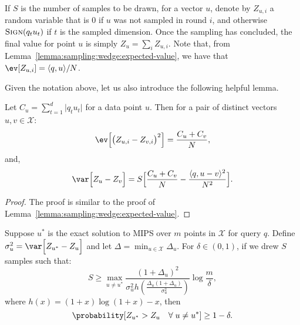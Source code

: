 If $S$ is the number of samples to be drawn, for a vector $u$, denote by $Z_{u,i}$ 
a random variable that is $0$ if $u$ was not sampled in round $i$,
and otherwise $\textsc{Sign}(q_t u_t)$ if $t$ is the sampled dimension.
Once the sampling has concluded, the final value for point $u$ is simply $Z_u = \sum_i Z_{u,i}$.
Note that, from Lemma~\ref{lemma:sampling:wedge:expected-value}, we have that
$\ev[Z_{u,i}] = \langle q, u \rangle / N$.

Given the notation above, let us also introduce the following helpful lemma.

\begin{lemma}
    Let $C_u = \sum_{t = 1}^d \lvert q_t u_t \rvert$ for a data point $u$. Then
    for a pair of distinct vectors $u, v \in \mathcal{X}$:
    \begin{equation*}
        \ev\Big[\big(Z_{u,i} - Z_{v,i} \big)^2\Big] = \frac{C_u + C_v}{N},
    \end{equation*}
    and,
    \begin{equation*}
        \var\Big[Z_u - Z_v\Big] = S \Big[ \frac{C_u + C_v}{N} - \frac{\langle q, u - v\rangle^2}{N^2} \Big].
    \end{equation*}
\end{lemma}
\begin{proof}
    The proof is similar to the proof of Lemma~\ref{lemma:sampling:wedge:expected-value}.
\end{proof}

\begin{theorem}
    \label{theorem:sampling:wedge:num-samples}
    Suppose $u^\ast$ is the exact solution to MIPS over $m$ points in $\mathcal{X}$ for query $q$.
    Define
    $\sigma_u^2 = \var\Big[Z_{u^\ast} - Z_u\Big]$ and
    let $\Delta = \min_{u \in \mathcal{X}} \Delta_u$.
    For $\delta \in (0, 1)$, if we drew $S$ samples such that:
    \begin{equation*}
        S \geq \max_{u \neq u^\ast}
        \frac{(1 + \Delta_u)^2}{\sigma^2_u h(\frac{\Delta_u (1 + \Delta_u)}{\sigma^2_u})}
        \log \frac{m}{\delta},
    \end{equation*}
    where $h(x) = (1 + x)\log(1 + x) - x$, then
    \begin{equation*}
        \probability[Z_{u^\ast} > Z_u \quad \forall \; u \neq u^\ast] \geq 1 - \delta.
    \end{equation*}
\end{theorem}

